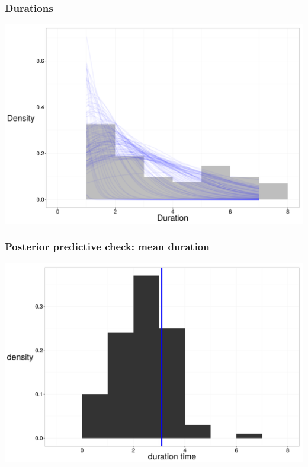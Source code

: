 \documentclass{beamer}
\begin{document}
\begin{frame}
  \frametitle{Durations}
  \begin{center}
    \includegraphics[height = 0.8\textheight, width = \textwidth, keepaspectratio = true]{figure/wei_dur_post}
  \end{center}
\end{frame}

\begin{frame}
  \frametitle{Posterior predictive check: mean duration}
  \begin{center}
    \includegraphics[height = 0.8\textheight, width = \textwidth, keepaspectratio = true]{figure/wei_mean_ppc}
  \end{center}
\end{frame}
\end{document}

